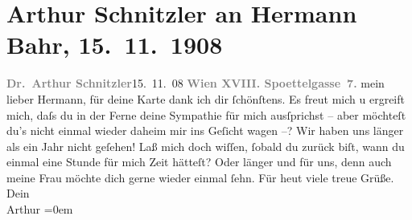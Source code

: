 

         
         \renewcommand{\erwaehntePersonen}{Personen: Hermann Bahr, Olga Schnitzler}
         \renewcommand{\erwaehnteOrte}{Orte: Edmund-Weiß-Gasse, Wien}
         \renewcommand{\erwaehnteWerke}{}
               \section[Arthur Schnitzler an Hermann Bahr, 15. 11. 1908]{ Arthur Schnitzler an Hermann Bahr, 15. 11. 1908}\nopagebreak{}\rehead{ }\begin{ledgroupsized}[t]{13cm}\normalsize\beginnumbering \toendnotes[C]{\smallbreak\pagebreak[2]} 
\toendnotes[C]{\smallbreak}\pstart
           \noindent{}{\pb}\textcolor{gray}{\textbf{Dr. Arthur Schnitzler}}\hfill 15. 11. 08\pend
           \pstart
           \textcolor{gray}{\textbf{Wien XVIII. Spoettelgasse 7.}}\pend
           \pstart
           mein lieber Hermann, für deine Karte dank ich dir ſchönſtens. Es
               freut mich u ergreift mich, daſs du in der Ferne deine Sympathie für mich ausſprichst
               – aber möchteſt du’s nicht einmal wieder daheim mir ins Geſicht wagen –? Wir haben
               uns länger {\pb}als ein
               Jahr nicht geſehen! Laß mich doch wiſſen, ſobald du zurück biſt, wann du einmal eine
               Stunde für mich Zeit hätteſt? Oder länger und für uns, denn auch meine Frau möchte dich gerne wieder
               einmal ſehn.\pend
           \pstart
           Für heut viele treue Grüße.{\\[\baselineskip]}Dein{\\[\baselineskip]}\spacefill\mbox{Arthur}\pend
           \leftskip=0em{}
         
         \endnumbering{}\end{ledgroupsized}  \newcommand{\dateiname}{L01803}\newcommand{\titel}{Arthur Schnitzler an Hermann Bahr, 15. 11. 1908}\newcommand{\editorInnen}{ Kurt Ifkovits,  Martin Anton Müller}
      